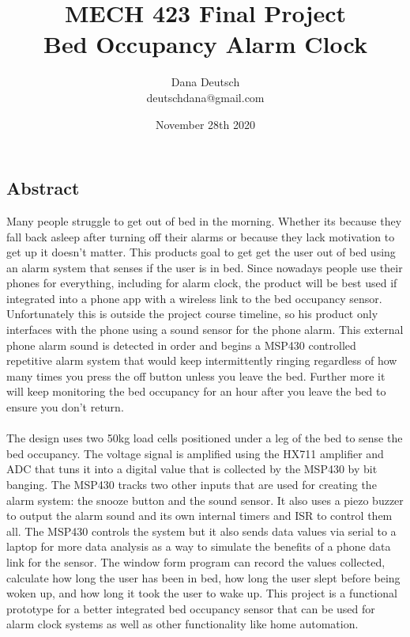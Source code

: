\documentclass[11pt]{article}
\title{\textbf{MECH 423 Final Project \\
		Bed Occupancy Alarm Clock}}
\author{Dana Deutsch \\
		deutschdana@gmail.com}
\date{November 28th 2020}
\begin{document}
\maketitle
\subsection*{Abstract}
Many people struggle to get out of bed in the morning. 
Whether its because they fall back asleep after turning off their alarms or because they lack motivation to get up it doesn't matter.
This products goal to get get the user out of bed using an alarm system that senses if the user is in bed.
Since nowadays people use their phones for everything, including for alarm clock, the product will be best used if integrated into a phone app with a wireless link to the bed occupancy sensor. 
Unfortunately this is outside the project course timeline, so his product only interfaces with the phone using a sound sensor for the phone alarm.
This external phone alarm sound is detected in order and begins a MSP430 controlled repetitive alarm system that would keep intermittently ringing regardless of how many times you press the off button unless you leave the bed.
Further more it will keep monitoring the bed occupancy for an hour after you leave the bed to ensure you  don't return.\\
\\
The design uses two 50kg load cells positioned under a leg of the bed to sense the bed occupancy.
The voltage signal is amplified using the HX711 amplifier and ADC that tuns it into a digital value that is collected by the MSP430 by bit banging.
The MSP430 tracks two other inputs that are used for creating the alarm system: the snooze button and the sound sensor.
It also uses a piezo buzzer to output the alarm sound and its own internal timers and ISR to control them all. 
The MSP430 controls the system but it also sends data values via serial to a laptop for more data analysis as a way to simulate the benefits of a phone data link for the sensor.
The window form program can record the values collected, calculate how long the user has been in bed, how long the user slept before being woken up, and how long it took the user to wake up.
This project is a functional prototype for a better integrated bed occupancy sensor that can be used for alarm clock systems as well as other functionality like home automation.    

\newpage
\tableofcontents
\newpage
\end{document}
